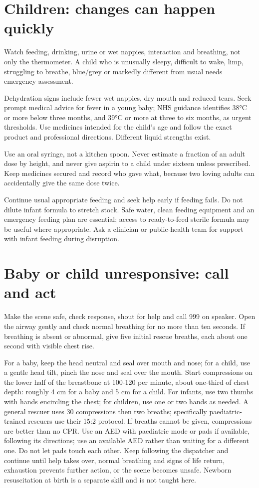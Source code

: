 \documentclass[10pt,openright]{book}
\begin{document}
\section*{Children: changes can happen quickly}
Watch feeding, drinking, urine or wet nappies, interaction and breathing, not only the thermometer. A child who is unusually sleepy, difficult to wake, limp, struggling to breathe, blue/grey or markedly different from usual needs emergency assessment.

Dehydration signs include fewer wet nappies, dry mouth and reduced tears. Seek prompt medical advice for fever in a young baby; NHS guidance identifies 38°C or more below three months, and 39°C or more at three to six months, as urgent thresholds. Use medicines intended for the child's age and follow the exact product and professional directions. Different liquid strengths exist.

Use an oral syringe, not a kitchen spoon. Never estimate a fraction of an adult dose by height, and never give aspirin to a child under sixteen unless prescribed. Keep medicines secured and record who gave what, because two loving adults can accidentally give the same dose twice.

Continue usual appropriate feeding and seek help early if feeding fails. Do not dilute infant formula to stretch stock. Safe water, clean feeding equipment and an emergency feeding plan are essential; access to ready-to-feed sterile formula may be useful where appropriate. Ask a clinician or public-health team for support with infant feeding during disruption.

\section*{Baby or child unresponsive: call and act}
Make the scene safe, check response, shout for help and call 999 on speaker. Open the airway gently and check normal breathing for no more than ten seconds. If breathing is absent or abnormal, give five initial rescue breaths, each about one second with visible chest rise.

For a baby, keep the head neutral and seal over mouth and nose; for a child, use a gentle head tilt, pinch the nose and seal over the mouth. Start compressions on the lower half of the breastbone at 100-120 per minute, about one-third of chest depth: roughly 4 cm for a baby and 5 cm for a child. For infants, use two thumbs with hands encircling the chest; for children, use one or two hands as needed. A general rescuer uses 30 compressions then two breaths; specifically paediatric-trained rescuers use their 15:2 protocol. If breaths cannot be given, compressions are better than no CPR. Use an AED with paediatric mode or pads if available, following its directions; use an available AED rather than waiting for a different one. Do not let pads touch each other. Keep following the dispatcher and continue until help takes over, normal breathing and signs of life return, exhaustion prevents further action, or the scene becomes unsafe. Newborn resuscitation at birth is a separate skill and is not taught here.
\end{document}

